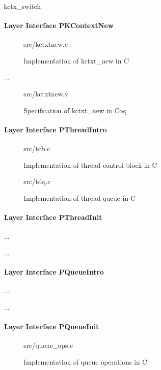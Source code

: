 \textsf{kctx\_switch}

\paragraph{Layer Interface PKContextNew}

\begin{figure}
	 {src/kctxtnew.c}
	\caption{Implementation of \textsf{kctxt\_new} in C}
	\label{fig:kctxtnew_c}
\end{figure}

...

\begin{figure}
	 {src/kctxtnew.v}
	\caption{Specification of \textsf{kctxt\_new} in Coq}
	\label{fig:kctxtnew_v}
\end{figure}


\paragraph{Layer Interface PThreadIntro}

\begin{figure}
	 {src/tcb.c}
	\caption{Implementation of thread control block in C}
	\label{fig:tcb_c}
\end{figure}

\begin{figure}
	 {src/tdq.c}
	\caption{Implementation of thread queue in C}
	\label{fig:tdq_c}
\end{figure}

\paragraph{Layer Interface PThreadInit}
...

...


\paragraph{Layer Interface PQueueIntro}
...

...

\paragraph{Layer Interface PQueueInit}

\begin{figure}
	 {src/queue_ops.c}
	\caption{Implementation of queue operations in C}
	\label{fig:queue_ops_c}
\end{figure}


